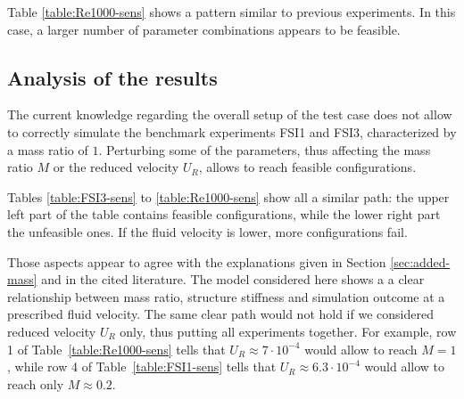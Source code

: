 Table \ref{table:Re1000-sens} shows a pattern similar to previous experiments. In this case, a larger number of parameter combinations appears to be feasible. 

\subsection{Analysis of the results}

The current knowledge regarding the overall setup of the test case does not allow to correctly simulate the benchmark experiments FSI1 and FSI3, characterized by a mass ratio of $1$.
Perturbing some of the parameters, thus affecting the mass ratio $M$ or the reduced velocity $U_R$, allows to reach feasible configurations. 

Tables \ref{table:FSI3-sens} to \ref{table:Re1000-sens} show all a similar path: the upper left part of the table contains feasible configurations, while the lower right part the unfeasible ones. If the fluid velocity is lower, more configurations fail.

Those aspects appear to agree with the explanations given in Section \ref{sec:added-mass} and in the cited literature. The model considered here shows a a clear relationship between mass ratio, structure stiffness and simulation outcome at a prescribed fluid velocity. The same clear path would not hold if we considered reduced velocity $U_R$ only, thus putting all experiments together. For example, row 1 of Table~\ref{table:Re1000-sens} tells that $U_R \approx 7\cdot 10^{-4}$ would allow to reach $M=1$, while row 4 of Table~\ref{table:FSI1-sens} tells that $U_R \approx 6.3\cdot 10^{-4}$ would allow to reach only $M\approx0.2$.



